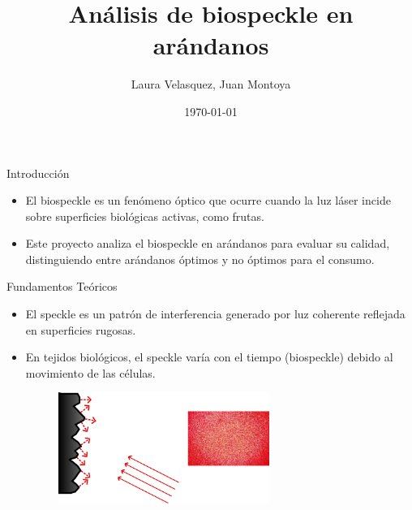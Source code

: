 \documentclass{beamer}
\title{Análisis de biospeckle en arándanos}
\author{Laura Velasquez, Juan Montoya}
\institute{FCEN@UdeA}
\date{\today}
\begin{document}
\begin{frame}
    \titlepage
\end{frame}

\begin{frame}{Introducción}
    \begin{itemize}
        \item El biospeckle es un fenómeno óptico que ocurre cuando la luz láser incide sobre superficies biológicas activas, como frutas.
        \item Este proyecto analiza el biospeckle en arándanos para evaluar su calidad, distinguiendo entre arándanos óptimos y no óptimos para el consumo.
    \end{itemize}
\end{frame}


\begin{frame}{Fundamentos Teóricos}
    \begin{itemize}
        \item El speckle es un patrón de interferencia generado por luz coherente reflejada en superficies rugosas.
        \item En tejidos biológicos, el speckle varía con el tiempo (biospeckle) debido al movimiento de las células.
        \\[0.5cm]
        \begin{figure}
            \includegraphics[width=0.65\textwidth]{Observacion.png}
        \end{figure}
    \end{itemize}
\end{frame}
\end{document}
